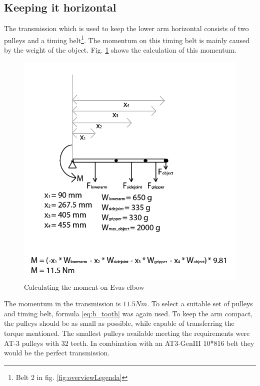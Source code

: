 \documentclass[technical_document.tex]{subfiles}
\begin{document}
\subsection{Keeping it horizontal}

The transmission which is used to keep the lower arm horizontal consists of two pulleys and a timing belt\footnote{Belt 2 in fig. \ref{fig:overviewLegenda}}. The momentum on this timing belt is mainly caused by the weight of the object. Fig. \ref{fig:driveTrain_elbow} shows the calculation of this momentum.

\begin{figure}[ht!]
	\centering
	\mbox{\includegraphics[scale=0.5]{Images/driveTrain_elbow.png}}
	\caption{Calculating the moment on Eva\textquotesingle{}s elbow}
	\label{fig:driveTrain_elbow}
\end{figure}

The momentum in the transmission is $11.5Nm$. To select a suitable set of pulleys and timing belt, formula \ref{eq:b_tooth} was again used. To keep the arm compact, the pulleys should be as small as possible, while capable of transferring the torque mentioned. The smallest pulleys available meeting the requirements were AT-3 pulleys with 32 teeth. In combination with an AT3-GenIII 10*816 belt they would be the perfect transmission. 
\end{document}
